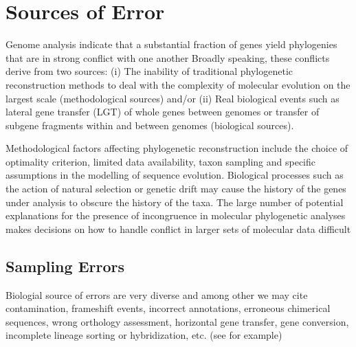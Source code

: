 \section{Sources of Error} \label{sec:error-sources}

%
Genome analysis indicate that a substantial fraction of genes yield phylogenies that are in strong conflict with one another Broadly speaking, these conflicts derive from two sources: (i) The inability of traditional phylogenetic reconstruction methods to deal with the complexity of molecular evolution on the largest scale (methodological sources) and/or (ii) Real biological events such as lateral gene transfer (LGT) of whole genes between genomes or transfer of subgene fragments within and between genomes (biological sources).

Methodological factors affecting phylogenetic reconstruction include the choice of optimality criterion, limited data availability, taxon sampling and specific assumptions in the modelling of sequence evolution. Biological processes such as the action of natural selection or genetic drift may cause the history of the genes under analysis to obscure the history of the taxa. The large number of potential explanations for the presence of incongruence in molecular phylogenetic analyses makes decisions on how to handle conflict in larger sets of molecular data difficult \cite{rokas2003genome}
\subsection{Sampling Errors} \label{sec:sampling-error}

Biologial source of errors are very diverse and among other we may cite  contamination,  frameshift  events,  incorrect  annotations,  erroneous  chimerical  sequences,  wrong orthology assessment, horizontal gene transfer, gene conversion, incomplete lineage sorting or hybridization, etc. (see \cite{philippe2017pitfalls} for example)

